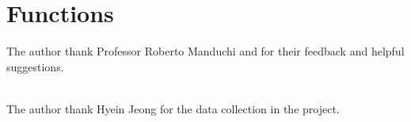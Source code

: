 \documentclass[11pt]{ucscthesis}
\begin{document}
\chapter{Functions}





\def\baselinestretch{1.0}\large\normalsize



\begin{acknowledgements}
The author thank Professor Roberto Manduchi and for their feedback and helpful suggestions.

\\
The author thank Hyein Jeong for the data collection in the project.
\end{acknowledgements}
\end{document}
